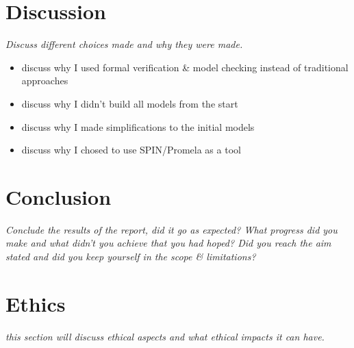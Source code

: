 \chapter{Discussion} 

\textit{Discuss different choices made and why they were made.} \\

\begin{itemize}
\item discuss why I used formal verification \& model checking instead of traditional approaches
\item discuss why I didn't build all models from the start
\item discuss why I made simplifications to the initial models
\item discuss why I chosed to use SPIN/Promela as a tool
\end{itemize}

\chapter{Conclusion}

\textit{Conclude the results of the report, did it go as expected? What progress did you make and what didn't you achieve that you had hoped? Did you reach the aim stated and did you keep yourself in the scope \& limitations? }

\chapter{Ethics}

\textit{this section will discuss ethical aspects and what ethical impacts it can have.}
